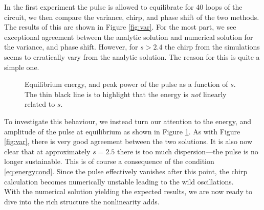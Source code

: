 In the first experiment the pulse is allowed to equilibrate for 40 loops of the circuit, we then compare the variance, chirp, and phase shift of the two methods. The results of this are shown in Figure \ref{fig:var}. For the most part, we see exceptional agreement between the analytic solution and numerical solution for the variance, and phase shift. However, for $s > 2.4$ the chirp from the simulations seems to erratically vary from the analytic solution. The reason for this is quite a simple one. \\
\begin{figure}[tbp]
\centering

\caption[Equilibrium energy, and peak power of the pulse as a function of $s$.]{Equilibrium energy, and peak power of the pulse as a function of $s$. The thin black line is to highlight that the energy is \emph{not} linearly related to $s$.}
\label{fig:valenergy}
\end{figure}

To investigate this behaviour, we instead turn our attention to the energy, and amplitude of the pulse at equilibrium as shown in Figure \ref{fig:valenergy}. As with Figure \ref{fig:var}, there is very good agreement between the two solutions. It is also now clear that at approximately $s = 2.5$ there is too much dispersion---the pulse is no longer sustainable. This is of course a consequence of the condition \eqref{eq:energycond}. Since the pulse effectively vanishes after this point, the chirp calculation becomes numerically unstable leading to the wild oscillations. \\

With the numerical solution yielding the expected results, we are now ready to dive into the rich structure the nonlinearity adds.

